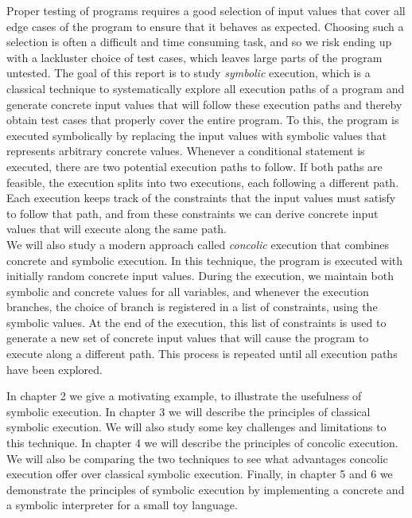 Proper testing of programs requires a good selection of input values that cover all edge cases of the program to ensure that it behaves as expected. Choosing such a selection is often a difficult and time consuming task, and so we risk ending up with a lackluster choice of test cases, which leaves large parts of the program untested. The goal of this report is to study \emph{symbolic} execution, which is a classical technique to systematically explore all execution paths of a program and generate concrete input values that will follow these execution paths and thereby obtain test cases that properly cover the entire program. To this, the program is executed symbolically by replacing the input values with symbolic values that represents arbitrary concrete values. Whenever a conditional statement is executed, there are two potential execution paths to follow. If both paths are feasible, the execution splits into two executions, each following a different path. Each execution keeps track of the constraints that the input values must satisfy to follow that path, and from these constraints we can derive concrete input values that will execute along the same path.
\\ 
We will also study a modern approach called \emph{concolic} execution that combines concrete and symbolic execution. In this technique, the program is executed with initially random concrete input values. During the execution, we maintain both symbolic and concrete values for all variables, and whenever the execution branches, the choice of branch is registered in a list of constraints, using the symbolic values. At the end of the execution, this list of constraints is used to generate a new set of concrete input values that will cause the program to execute along a different path. This process is repeated until all execution paths have been explored.
 

\newpage In chapter 2 we give a motivating example, to illustrate the usefulness of symbolic execution. In chapter 3 we will describe the principles of classical symbolic execution.  
 We will also study some key challenges and limitations to this technique. 
 In chapter 4 we will describe the principles of concolic execution. We will also be comparing the two techniques to see what advantages concolic execution offer over classical symbolic execution. Finally, in chapter 5 and 6 we demonstrate the principles of symbolic execution by implementing a concrete and a symbolic interpreter for a small toy language.  